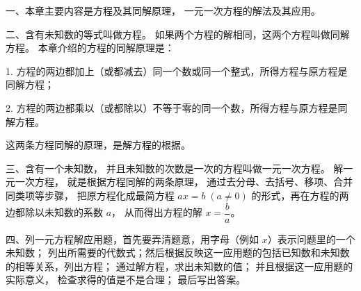 \xiaojie

一、本章主要内容是方程及其同解原理， 一元一次方程的解法及其应用。

二、含有未知数的等式叫做方程。 如果两个方程的解相同，这两个方程叫做同解方程。 本章介绍的方程的同解原理是：

1. 方程的两边都加上（或都减去）同一个数或同一个整式，所得方程与原方程是同解方程；

2. 方程的两边都乘以（或都除以）不等于零的同一个数，所得方程与原方程是同解方程。

这两条方程同解的原理，是解方程的根据。

\begin{enhancedline}
三、含有一个未知数， 并且未知数的次数是一次的方程叫做一元一次方程。
解一元一次方程， 就是根据方程同解的两条原理， 通过去分母、去括号、移项、合并同类项等步骤，
把原方程化成最简方程 $ax = b \; (a \neq 0)$ 的形式，再在方程的两边都除以未知数的系数 $a$，
从而得出方程的解 $x = \dfrac{b}{a}$。

四、列一元方程解应用题，首先要弄清题意，用字母（例如 $x$）表示问题里的一个未知数；
列出所需要的代数式；然后根据反映这一应用题的包括已知数和未知数的相等关系，列出方程；
通过解方程，求出未知数的值； 并且根据这一应用题的实际意义， 检查求得的值是不是合理；
最后写出答案。
\end{enhancedline}

